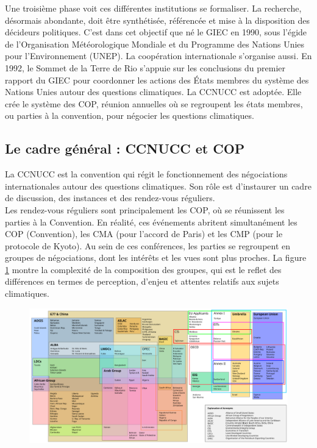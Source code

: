 Une troisième phase voit ces différentes institutions se formaliser. La recherche, désormais abondante, doit être synthétisée, référencée et mise à la disposition des décideurs politiques. C'est dans cet objectif que né le \Gls{GIEC} en 1990, sous l'égide de l'Organisation Météorologique Mondiale et du Programme des Nations Unies pour l'Environnement (UNEP). La coopération internationale s'organise aussi. En 1992, le Sommet de la Terre de Rio s'appuie sur les conclusions du premier rapport du \Gls{GIEC} pour coordonner les actions des États membres du système des Nations Unies autour des questions climatiques. La \Gls{CCNUCC} est adoptée. Elle crée le système des \Gls{COP}, réunion annuelles où se regroupent les états membres, ou parties à la convention, pour négocier les questions climatiques.



\subsection{Le cadre général : CCNUCC et COP}
\label{sect:1.2.2}


La \Gls{CCNUCC} est la convention qui régit le fonctionnement des négociations internationales autour des questions climatiques. Son rôle est d'instaurer un cadre de discussion, des instances et des rendez-vous réguliers. \\

Les rendez-vous réguliers sont principalement les \Gls{COP}, où se réunissent les parties à la Convention. En réalité, ces événements abritent simultanément les COP (Convention), les CMA (pour l'accord de Paris) et les CMP (pour le protocole de Kyoto). Au sein de ces conférences, les parties se regroupent en groupes de négociations, dont les intérêts et les vues sont plus proches. La figure \ref{fig:COP} montre la complexité de la composition des groupes, qui est le reflet des différences en termes de perception, d'enjeu et attentes relatifs aux sujets climatiques. \\

\begin{figure}
    \centering
    \includegraphics[width=1\linewidth]{figures/UNFCCC_Party_Groupings.svg.png}
    \label{fig:COP}
\end{figure}

